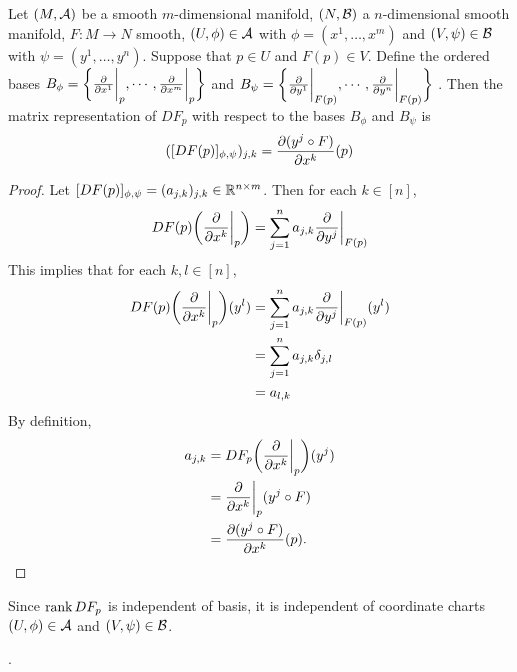\documentclass{book}
\begin{document}
	\begin{ex}
		Let $(M, \mathcal{A})$ be a smooth $m$-dimensional manifold, $(N, \mathcal{B})$ a $n$-dimensional smooth manifold, $F: M \rightarrow N$ smooth, $(U, \phi) \in \mathcal{A}$ with $\phi = (x^1, \dots, x^m)$ and $(V, \psi) \in \mathcal{B}$ with $\psi = (y^1, \dots, y^n)$. Suppose that $p \in U$ and $F(p) \in V$. Define the ordered bases $B_\phi = \bigg \{\frac{\partial}{\partial x^1} \bigg|_p, \cdots, \frac{\partial}{\partial x^m} \bigg|_p \bigg \}$ and $B_{\psi} = \bigg \{\frac{\partial}{\partial y^1} \bigg|_{F(p)}, \cdots, \frac{\partial}{\partial y^n} \bigg|_{F(p)} \bigg \}$ .
		Then the matrix representation of $DF_p$ with respect to the bases
		$B_{\phi}$ and $B_{\psi}$ is $$ ([DF(p)]_{\phi, \psi})_{j, k} =  \frac{\partial (y^j \circ F)}{\partial x^k}(p)$$
	\end{ex}

	\begin{proof}
		Let $[DF(p)]_{\phi, \psi} = (a_{j,k})_{j,k} \in \mathbb{R}^{n \times m}$. Then for each $k \in [n]$, $$DF(p) \bigg(\frac{\partial }{\partial x^k} \bigg|_p\bigg) = \sum_{j=1}^n a_{j,k}\frac{\partial }{\partial y^j} \bigg|_{F(p)}$$
		This implies that for each $k, l \in [n]$,
		\begin{align*}
			DF(p) \bigg(\frac{\partial }{\partial x^k} \bigg|_p \bigg) (y^l )
			&=  \sum_{j=1}^n a_{j,k}\frac{\partial }{\partial y^j} \bigg|_{F(p)} (y^l) \\
			&= \sum_{j=1}^n a_{j,k} \delta_{j,l} \\
			&= a_{l, k}
		\end{align*}
		By definition, 
		\begin{align*}
			a_{j,k}
			& = DF_p \bigg(\frac{\partial }{\partial x^k} \bigg|_p\bigg) (y^j) \\
			&=  \frac{\partial }{\partial x^k} \bigg|_p (y^j \circ F) \\
			&= \frac{\partial (y^j \circ F)}{\partial x^k} (p).
		\end{align*}
	\end{proof}
	
	
	\begin{note}
	Since $\operatorname{\text{rank}} DF_p$ is independent of basis, it is independent of coordinate charts $(U, \phi) \in \mathcal{A}$ and $(V, \psi) \in \mathcal{B}$. 
	\end{note}	

	\begin{ex}
		.
	\end{ex}
	
	
	
	\begin{ex}
		
	\end{ex}
\end{document}
